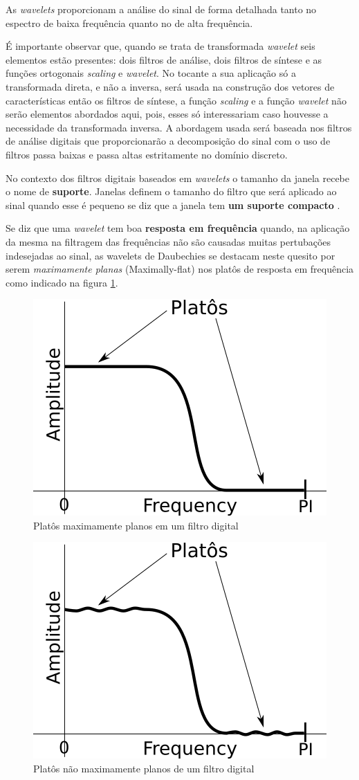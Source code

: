\begin{myenv}{1.5}
				\par As \textit{wavelets} proporcionam a análise do sinal de forma detalhada tanto no espectro de baixa frequência quanto no de alta frequência.
				
				\par É importante observar que, quando se trata de transformada \textit{wavelet} seis elementos estão presentes: dois filtros de análise, dois filtros de síntese e as funções ortogonais \textit{scaling} e \textit{wavelet}. No tocante a sua aplicação só a transformada direta, e não a inversa, será usada na construção dos vetores de características então os filtros de síntese, a função \textit{scaling} e a função \textit{wavelet} não serão elementos abordados aqui, pois, esses só interessariam caso houvesse a necessidade da transformada inversa. A abordagem usada será baseada nos filtros de análise digitais que proporcionarão a decomposição do sinal com o uso de filtros passa baixas e passa altas estritamente no domínio discreto.
	
				\par No contexto dos filtros digitais baseados em \textit{wavelets} o tamanho da janela recebe o nome de \textbf{suporte}. Janelas definem o tamanho do filtro que será aplicado ao sinal quando esse é pequeno se diz que a janela tem \textbf{um suporte compacto} \cite{robi2003}.
			
				\par Se diz que uma \textit{wavelet} tem boa \textbf{resposta em frequência} quando, na aplicação da mesma na filtragem das frequências não são causadas muitas pertubações indesejadas ao sinal, as wavelets de Daubechies se destacam neste quesito por serem \textit{maximamente planas} (Maximally-flat) nos platôs de resposta em frequência como indicado na figura \ref{fig:daubechies}.

				\begin{figure}[h]
					\centering
					\includegraphics[width=0.3\linewidth]{images/daubechies}
					\caption{Platôs maximamente planos em um filtro digital}
					\label{fig:daubechies}
				\end{figure}

				\begin{figure}[h]
					\centering
					\includegraphics[width=0.3\linewidth]{images/noMaximallyFlat}
					\caption{Platôs não maximamente planos de um filtro digital}
					\label{fig:nomaximallyflat}
				\end{figure}
			

\end{myenv}
